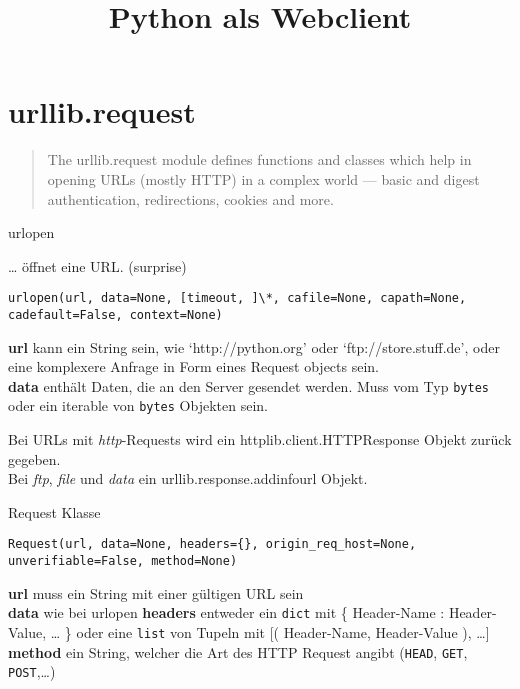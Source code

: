 \documentclass[ignorenonframetext,]{beamer}
\title{Python als Webclient}
\date{}
\begin{document}
\frame{\titlepage}

\section{urllib.request}\label{urllib.request}

\begin{frame}

\begin{quote}
The urllib.request module defines functions and classes which help in
opening URLs (mostly HTTP) in a complex world --- basic and digest
authentication, redirections, cookies and more.
\end{quote}

\end{frame}

\begin{frame}[fragile]{urlopen}

\ldots{} öffnet eine URL. (surprise)

\begin{verbatim}
urlopen(url, data=None, [timeout, ]\*, cafile=None, capath=None, cadefault=False, context=None)
\end{verbatim}

\textbf{url} kann ein String sein, wie `http://python.org' oder
`ftp://store.stuff.de', oder eine komplexere Anfrage in Form eines
Request objects sein.\\
\textbf{data} enthält Daten, die an den Server gesendet werden. Muss vom
Typ \texttt{bytes} oder ein iterable von \texttt{bytes} Objekten sein.

Bei URLs mit \emph{http}-Requests wird ein httplib.client.HTTPResponse
Objekt zurück gegeben.\\
Bei \emph{ftp}, \emph{file} und \emph{data} ein
urllib.response.addinfourl Objekt.

\end{frame}

\begin{frame}[fragile]{Request Klasse}

\begin{verbatim}
Request(url, data=None, headers={}, origin_req_host=None, unverifiable=False, method=None)
\end{verbatim}

\textbf{url} muss ein String mit einer gültigen URL sein\\
\textbf{data} wie bei urlopen \textbf{headers} entweder ein
\texttt{dict} mit \{ Header-Name : Header-Value, \ldots{} \} oder eine
\texttt{list} von Tupeln mit {[}( Header-Name, Header-Value ),
\ldots{}{]}\\
\textbf{method} ein String, welcher die Art des HTTP Request angibt
(\texttt{HEAD}, \texttt{GET}, \texttt{POST},\ldots{})

\end{frame}
\end{document}
